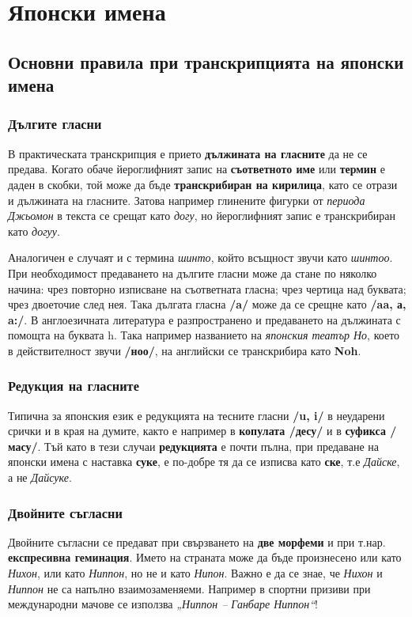 \chapter{Японски имена}
\label{chap:imena}
\section{Основни правила при транскрипцията на японски имена}
\subsection{Дългите гласни}
В практическата транскрипция е прието \textbf{дължината на гласните} да не се предава.
Когато обаче йероглифният запис на \textbf{съответното име} или \textbf{термин} е даден в скобки, той може да бъде \textbf{транскрибиран на кирилица}, като се отрази и дължината на гласните.
Затова например глинените фигурки от \textit{периода Джьомон} в текста се срещат като \textit{догу}, но йероглифният запис е транскрибиран като \textit{догуу}.

Аналогичен е случаят и с термина \textit{шинто}, който всъщност звучи като \textit{шинтоо}.
При необходимост предаването на дългите гласни може да стане по няколко начина: чрез повторно изписване на съответната гласна; чрез чертица над буквата; чрез двоеточие след нея. Така дългата гласна \textbf{/a/} може да се срещне като \textbf{/aa, \-а, a:/}.
В англоезичната литература е разпространено и предаването на дължината с помощта на буквата h. Така например названието на \textit{японския театър Но}, което в действителност звучи \textbf{/ноо/},
на английски се транскрибира като \textbf{Noh}.

\subsection{Редукция на гласните}
Типична за японския език е редукцията на тесните гласни \textbf{/u, i/} в неударени срички и в края на думите, както е например в \textbf{копулата /десу/} и в \textbf{суфикса /масу/}.
Тъй като в тези случаи \textbf{редукцията} е почти пълна, при предаване на японски имена с наставка \textbf{суке}, е по-добре тя да се изписва като \textbf{ске}, т.е \textit{Дайске}, а не \textit{Дайсуке}.

\subsection{Двойните съгласни}
Двойните съгласни се предават при свързването на \textbf{две морфеми} и при т.нар. \textbf{експресивна геминация}. Името на страната може да бъде произнесено или като \textit{Нихон}, или като \textit{Ниппон}, но не и като \textit{Нипон}. Важно е да се знае, че \textit{Нихон} и \textit{Ниппон} не са напълно взаимозаменяеми.
Например в спортни призиви при международни мачове се използва \textit{„Ниппон – Ганбаре Ниппон“}!

